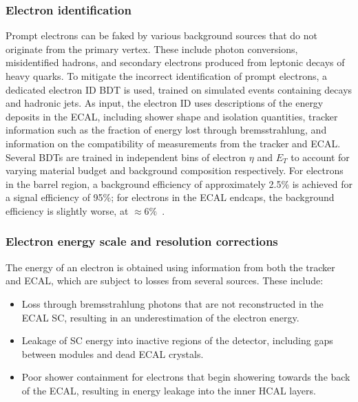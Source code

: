 \subsubsection{Electron identification}   
Prompt electrons can be faked by various background sources that do not originate from the primary vertex. These include photon conversions, misidentified hadrons, and secondary electrons produced from leptonic decays of heavy quarks. To mitigate the incorrect identification of prompt electrons, a dedicated electron ID BDT is used, trained on simulated events containing \Zee decays and hadronic jets. As input, the electron ID uses descriptions of the energy deposits in the ECAL, including shower shape and isolation quantities, tracker information such as the fraction of energy lost through bremsstrahlung, and information on the compatibility of measurements from the tracker and ECAL. Several BDTs are trained in independent bins of electron $\eta$ and $E_{T}$ to account for varying material budget and background composition respectively. For electrons in the barrel region, a background efficiency of approximately 2.5\% is achieved for a signal efficiency of 95\%; for electrons in the ECAL endcaps, the background efficiency is slightly worse, at ${\approx}6\%$~\cite{CMS_egamma_performance}.

\subsubsection{Electron energy scale and resolution corrections}

The energy of an electron is obtained using information from both the tracker and ECAL, which are subject to losses from several sources. These include:

\begin{itemize}
    \item Loss through bremsstrahlung photons that are not reconstructed in the ECAL SC, resulting in an underestimation of the electron energy.
    \item Leakage of SC energy into inactive regions of the detector, including gaps between modules and dead ECAL crystals.
    \item Poor shower containment for electrons that begin showering towards the back of the ECAL, resulting in energy leakage into the inner HCAL layers.
\end{itemize}

